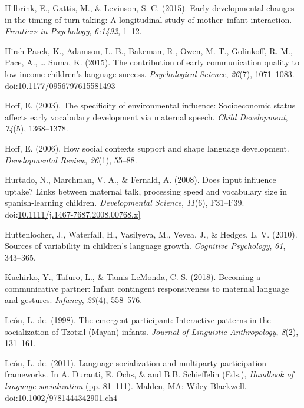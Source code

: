 \documentclass[floatsintext,man]{apa6}
\theoremstyle{definition}
\theoremstyle{definition}
\theoremstyle{definition}
\theoremstyle{remark}
\begin{document}
\hypertarget{ref-hilbrink2015early}{}
Hilbrink, E., Gattis, M., \& Levinson, S. C. (2015). Early developmental
changes in the timing of turn-taking: A longitudinal study of
mother--infant interaction. \emph{Frontiers in Psychology},
\emph{6:1492}, 1--12.

\hypertarget{ref-hirshpasek2015contribution}{}
Hirsh-Pasek, K., Adamson, L. B., Bakeman, R., Owen, M. T., Golinkoff, R.
M., Pace, A., \ldots{} Suma, K. (2015). The contribution of early
communication quality to low-income children's language success.
\emph{Psychological Science}, \emph{26}(7), 1071--1083.
doi:\href{https://doi.org/10.1177/0956797615581493}{10.1177/0956797615581493}

\hypertarget{ref-hoff2003specificity}{}
Hoff, E. (2003). The specificity of environmental influence:
Socioeconomic status affects early vocabulary development via maternal
speech. \emph{Child Development}, \emph{74}(5), 1368--1378.

\hypertarget{ref-hoff2006social}{}
Hoff, E. (2006). How social contexts support and shape language
development. \emph{Developmental Review}, \emph{26}(1), 55--88.

\hypertarget{ref-hurtado2008does}{}
Hurtado, N., Marchman, V. A., \& Fernald, A. (2008). Does input
influence uptake? Links between maternal talk, processing speed and
vocabulary size in spanish-learning children. \emph{Developmental
Science}, \emph{11}(6), F31--F39.
doi:\href{https://doi.org/10.1111/j.1467-7687.2008.00768.x\%5D}{10.1111/j.1467-7687.2008.00768.x{]}}

\hypertarget{ref-huttenlocher2010sources}{}
Huttenlocher, J., Waterfall, H., Vasilyeva, M., Vevea, J., \& Hedges, L.
V. (2010). Sources of variability in children's language growth.
\emph{Cognitive Psychology}, \emph{61}, 343--365.

\hypertarget{ref-kuchirko2017becoming}{}
Kuchirko, Y., Tafuro, L., \& Tamis-LeMonda, C. S. (2018). Becoming a
communicative partner: Infant contingent responsiveness to maternal
language and gestures. \emph{Infancy}, \emph{23}(4), 558--576.

\hypertarget{ref-deleon1998emergent}{}
León, L. de. (1998). The emergent participant: Interactive patterns in
the socialization of Tzotzil (Mayan) infants. \emph{Journal of
Linguistic Anthropology}, \emph{8}(2), 131--161.

\hypertarget{ref-deleon2011language}{}
León, L. de. (2011). Language socialization and multiparty participation
frameworks. In A. Duranti, E. Ochs, \& and B.B. Schieffelin (Eds.),
\emph{Handbook of language socialization} (pp. 81--111). Malden, MA:
Wiley-Blackwell.
doi:\href{https://doi.org/10.1002/9781444342901.ch4}{10.1002/9781444342901.ch4}
\end{document}
